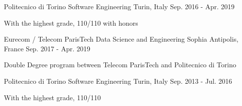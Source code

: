 

\begin{cventries}

  \cventry
    {Politecnico di Torino}
    { Software Engineering}
    {Turin, Italy}
    {Sep. 2016 - Apr. 2019}
    {
        \begin{cvitems}
            \item {With the highest grade, {\small 110/110} with honors}
        \end{cvitems}
    }

  \cventry
    {Eurecom / Telecom ParisTech} %
    { Data Science and Engineering} %
    {Sophia Antipolis, France} %
    {Sep. 2017 - Apr. 2019} %
    {
      \begin{cvitems} %
        \item {Double Degree program between Telecom ParisTech and Politecnico di Torino}
      \end{cvitems}
    }
  
  \cventry
    {Politecnico di Torino}
    { Software Engineering}
    {Turin, Italy}
    {Sep. 2013 - Jul. 2016}
    {
      \begin{cvitems}
        \item {With the highest grade, {\small 110/110}}
      \end{cvitems}
    }

\end{cventries}
